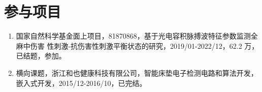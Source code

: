 {    \section*{参与项目}
    \begin{enumerate}
        \item 国家自然科学基金面上项目，81870868，基于光电容积脉搏波特征参数监测全麻中伤害
        性刺激-抗伤害性刺激平衡状态的研究，2019/01-2022/12，62.2 万，已结题，参加。
        \item 横向课题，浙江和也健康科技有限公司，智能床垫电子检测电路和算法开发，嵌入式开发，2015/12-2016/10，已完结。
    \end{enumerate}

    
    
    
}